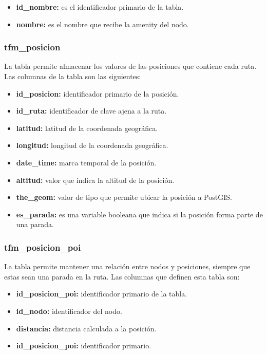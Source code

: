 \begin{itemize}
	\item \textbf{id\_nombre:} es el identificador primario de la tabla.
	\item \textbf{nombre:} es el nombre que recibe la amenity del nodo.
\end{itemize}

\subsubsection{tfm\_posicion}
La tabla  permite almacenar los valores de las posiciones que contiene cada ruta. Las columnas de la tabla son las siguientes:

\begin{itemize}
	\item \textbf{id\_posicion:} identificador primario de la posición.
	\item \textbf{id\_ruta:} identificador de clave ajena a la ruta.
	\item \textbf{latitud:} latitud de la coordenada geográfica.
	\item \textbf{longitud:} longitud de la coordenada geográfica.
	\item \textbf{date\_time:} marca temporal de la posición.
	\item \textbf{altitud:} valor que indica la altitud de la posición.
	\item \textbf{the\_geom:} valor de tipo  que permite ubicar la posición a PostGIS.
	\item \textbf{es\_parada:} es una variable booleana que indica si la posición forma parte de una parada.
\end{itemize}

\subsubsection{tfm\_posicion\_poi}
La tabla  permite mantener una relación entre nodos y posiciones, siempre que estas sean una parada en la ruta. Las columnas que definen esta tabla son:

\begin{itemize}
	\item \textbf{id\_posicion\_poì:} identificador primario de la tabla.
	\item \textbf{id\_nodo:} identificador del nodo.
	\item \textbf{distancia:} distancia calculada a la posición.
	\item \textbf{id\_posicion\_poi:} identificador primario.
\end{itemize}

